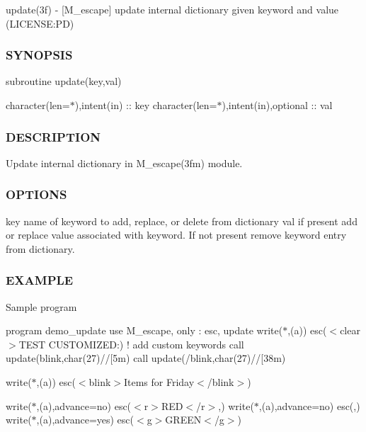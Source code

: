 update(3f) -\/ \mbox{[}M\+\_\+escape\mbox{]} update internal dictionary given keyword and value (L\+I\+C\+E\+N\+SE\+:PD) \subsubsection*{S\+Y\+N\+O\+P\+S\+IS}

subroutine update(key,val)

character(len=$\ast$),intent(in) \+:\+: key character(len=$\ast$),intent(in),optional \+:\+: val \subsubsection*{D\+E\+S\+C\+R\+I\+P\+T\+I\+ON}

Update internal dictionary in M\+\_\+escape(3fm) module. \subsubsection*{O\+P\+T\+I\+O\+NS}

key name of keyword to add, replace, or delete from dictionary val if present add or replace value associated with keyword. If not present remove keyword entry from dictionary. \subsubsection*{E\+X\+A\+M\+P\+LE}

Sample program

program demo\+\_\+update use M\+\_\+escape, only \+: esc, update write($\ast$,\textquotesingle{}(a)\textquotesingle{}) esc(\textquotesingle{}$<$clear$>$T\+E\+ST C\+U\+S\+T\+O\+M\+I\+Z\+ED\+:\textquotesingle{}) ! add custom keywords call update(\textquotesingle{}blink\textquotesingle{},char(27)//\textquotesingle{}\mbox{[}5m\textquotesingle{}) call update(\textquotesingle{}/blink\textquotesingle{},char(27)//\textquotesingle{}\mbox{[}38m\textquotesingle{})

write($\ast$,\textquotesingle{}(a)\textquotesingle{}) esc(\textquotesingle{}$<$blink$>$Items for Friday$<$/blink$>$\textquotesingle{})

write($\ast$,\textquotesingle{}(a)\textquotesingle{},advance=\textquotesingle{}no\textquotesingle{}) esc(\textquotesingle{}$<$r$>$R\+ED$<$/r$>$,\textquotesingle{}) write($\ast$,\textquotesingle{}(a)\textquotesingle{},advance=\textquotesingle{}no\textquotesingle{}) esc(,\textquotesingle{}) write($\ast$,\textquotesingle{}(a)\textquotesingle{},advance=\textquotesingle{}yes\textquotesingle{}) esc(\textquotesingle{}$<$g$>$G\+R\+E\+EN$<$/g$>$\textquotesingle{})


